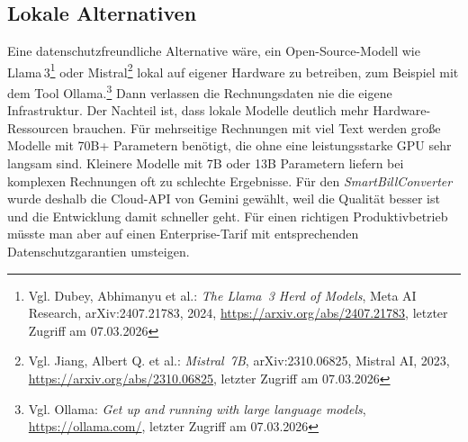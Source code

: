 \subsection{Lokale Alternativen}
Eine datenschutzfreundliche Alternative wäre, ein Open-Source-Modell wie Llama\,3\footnote{Vgl. Dubey, Abhimanyu et al.: \textit{The Llama~3 Herd of Models}, Meta AI Research, arXiv:2407.21783, 2024, \url{https://arxiv.org/abs/2407.21783}, letzter Zugriff am 07.03.2026} oder Mistral\footnote{Vgl. Jiang, Albert Q. et al.: \textit{Mistral~7B}, arXiv:2310.06825, Mistral AI, 2023, \url{https://arxiv.org/abs/2310.06825}, letzter Zugriff am 07.03.2026} lokal auf eigener Hardware zu betreiben, zum Beispiel mit dem Tool Ollama.\footnote{Vgl. Ollama: \textit{Get up and running with large language models}, \url{https://ollama.com/}, letzter Zugriff am 07.03.2026} Dann verlassen die Rechnungsdaten nie die eigene Infrastruktur.
Der Nachteil ist, dass lokale Modelle deutlich mehr Hardware-Ressourcen brauchen. Für mehrseitige Rechnungen mit viel Text werden große Modelle mit 70B+ Parametern benötigt, die ohne eine leistungsstarke GPU sehr langsam sind. Kleinere Modelle mit 7B oder 13B Parametern liefern bei komplexen Rechnungen oft zu schlechte Ergebnisse.
Für den \textit{SmartBillConverter} wurde deshalb die Cloud-API von Gemini gewählt, weil die Qualität besser ist und die Entwicklung damit schneller geht. Für einen richtigen Produktivbetrieb müsste man aber auf einen Enterprise-Tarif mit entsprechenden Datenschutzgarantien umsteigen.
